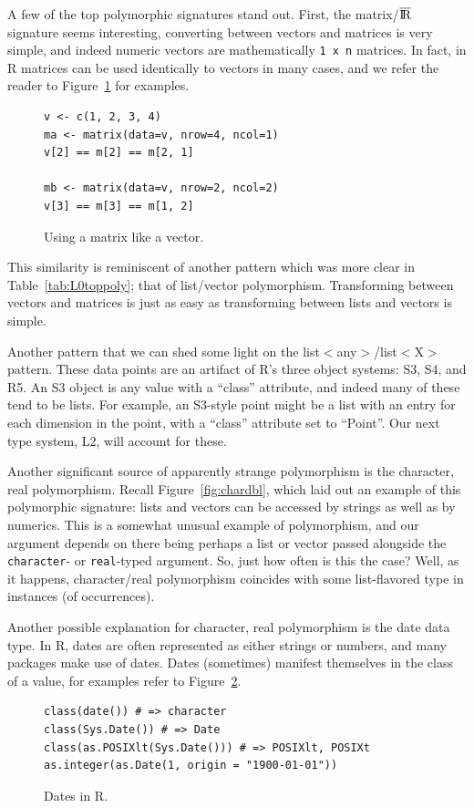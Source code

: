 \documentclass[acmsmall,10pt,review,anonymous]{acmart}\settopmatter{printfolios=true,printccs=false,printacmref=false}
\newcommand{\realv}{$\overline{\rm I\!R}$\xspace}
\begin{document}
A few of the top polymorphic signatures stand out.
First, the matrix/\realv signature seems interesting, converting between vectors and matrices is very simple, and indeed numeric vectors are mathematically {\tt 1 x n} matrices.
In fact, in R matrices can be used identically to vectors in many cases, and we refer the reader to Figure~\ref{fig:matasvec} for examples.
\begin{figure}[!hb]{\small\begin{lstlisting}[style=R]
v <- c(1, 2, 3, 4)
ma <- matrix(data=v, nrow=4, ncol=1)
v[2] == m[2] == m[2, 1]

mb <- matrix(data=v, nrow=2, ncol=2)
v[3] == m[3] == m[1, 2]
\end{lstlisting}}\caption{Using a matrix like a vector.}\label{fig:matasvec}\end{figure}

This similarity is reminiscent of another pattern which was more clear in Table~\ref{tab:L0toppoly}; that of list/vector polymorphism.
Transforming between vectors and matrices is just as easy as transforming between lists and vectors is simple.

Another pattern that we can shed some light on the list$<$any$>$/list$<$X$>$ pattern.
These data points are an artifact of R's three object systems: S3, S4, and R5.
An S3 object is any value with a ``class'' attribute, and indeed many of these tend to be lists.
For example, an S3-style point might be a list with an entry for each dimension in the point, with a ``class'' attribute set to ``Point''.
Our next type system, L2, will account for these.

Another significant source of apparently strange polymorphism is the character, real polymorphism.
Recall Figure~\ref{fig:chardbl}, which laid out an example of this polymorphic signature: lists and vectors can be accessed by strings as well as by numerics.
This is a somewhat unusual example of polymorphism, and our argument depends on there being perhaps a list or vector passed alongside the {\tt character}- or {\tt real}-typed argument.
So, just how often is this the case?
Well, as it happens, character/real polymorphism coincides with some list-flavored type in \INDEXCOINCIDENCE instances (\INDEXYPERC of occurrences).

Another possible explanation for character, real polymorphism is the date data type.
In R, dates are often represented as either strings or numbers, and many packages make use of dates.
Dates (sometimes) manifest themselves in the class of a value, for examples refer to Figure~\ref{fig:date}.
\begin{figure}[!hb]{\small\begin{lstlisting}[style=R]
class(date()) # => character
class(Sys.Date()) # => Date
class(as.POSIXlt(Sys.Date())) # => POSIXlt, POSIXt
as.integer(as.Date(1, origin = "1900-01-01"))
\end{lstlisting}}\caption{Dates in R.}\label{fig:date}\end{figure}
\end{document}
